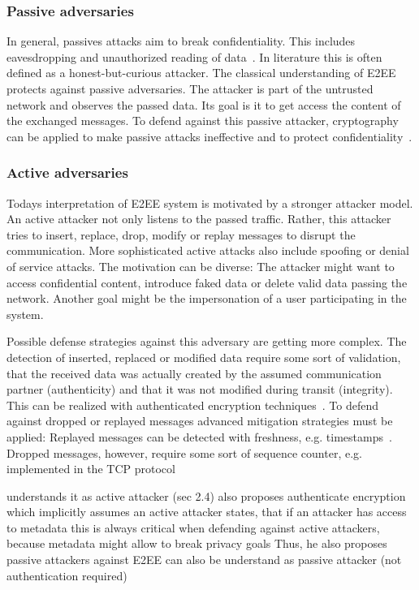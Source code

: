 \documentclass[../main.tex]{subfiles}
\begin{document}
\subsubsection{Passive adversaries}
In general, passives attacks aim to break confidentiality.
This includes eavesdropping and unauthorized reading of data~\cite{Eckert2018}. 
In literature this is often defined as a honest-but-curious attacker. 
The classical understanding of E2EE protects against passive adversaries. 
The attacker is part of the untrusted network and observes the passed data.
Its goal is it to get access the content of the exchanged messages.
To defend against this passive attacker, cryptography can be applied to make passive attacks ineffective and to protect confidentiality~\cite{Eckert2018}.


\subsubsection{Active adversaries}
Todays interpretation of E2EE system is motivated by a stronger attacker model.
An active attacker not only listens to the passed traffic.
Rather, this attacker tries to insert, replace, drop, modify or replay messages to disrupt the communication.
More sophisticated active attacks also include spoofing or denial of service attacks.
The motivation can be diverse: 
The attacker might want to access confidential content, introduce faked data or delete valid data passing the network.
Another goal might be the impersonation of a user participating in the system.~\cite{Eckert2018}

Possible defense strategies against this adversary are getting more complex.
The detection of inserted, replaced or modified data require some sort of validation, that the received data was actually created by the assumed communication partner (authenticity) and that it was not modified during transit (integrity).
This can be realized with authenticated encryption techniques~\cite{Mallory2022}.
To defend against dropped or replayed messages advanced mitigation strategies must be applied:
Replayed messages can be detected with freshness, e.g. timestamps~\cite[419]{Eckert2018}.
Dropped messages, however, require some sort of sequence counter, e.g. implemented in the TCP protocol ~\cite[115]{Eckert2018}


\cite{Mallory2022} understands it as active attacker (sec 2.4)
\cite{Hale2022} also proposes authenticate encryption which implicitly assumes an active attacker
\cite{Nabeel2017} states, that if an attacker has access to metadata this is always critical when defending against active attackers, because metadata might allow to break privacy goals
Thus, he also proposes passive attackers against E2EE can also be understand as passive attacker (not authentication required)
\end{document}
